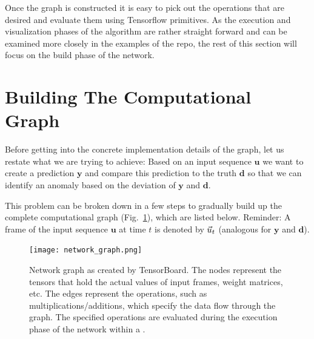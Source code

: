 Once the graph is constructed it is easy to pick out the operations
that are desired and evaluate them using Tensorflow primitives. As the
execution and visualization phases of the algorithm are rather straight forward
and can be examined more closely in the examples of the  repo, the
rest of this section will focus on the build phase of the network. 


\section{Building The Computational Graph}%
\label{sec:building_the_computational_graph}

Before getting into the concrete implementation details of the graph, let us
restate what we are trying to achieve:  Based on an input sequence $\mathbf{u}$
we want to create a prediction $\mathbf{y}$ and compare this prediction to the
truth $\mathbf{d}$ so that we can identify an anomaly based on the deviation of
$\mathbf{y}$ and $\mathbf{d}$. 

This problem can be broken down in a few steps to gradually build up the
complete computational graph (Fig.~\ref{fig:network_graph}), which are listed
below.  Reminder: A frame of the input sequence $\mathbf{u}$ at time $t$ is
denoted by $\vec{u}_t$ (analogous for $\mathbf{y}$ and $\mathbf{d}$).

\begin{figure}
  \centering
  \texttt{[image: network\_graph.png]}
  \caption{Network graph as created by TensorBoard. The nodes represent the
  tensors that hold the actual values of input frames, weight matrices, etc.
  The edges represent the operations, such as multiplications/additions, which
  specify the data flow through the graph. The specified operations are evaluated
  during the execution phase of the network within a .}
  \label{fig:network_graph}
\end{figure}


